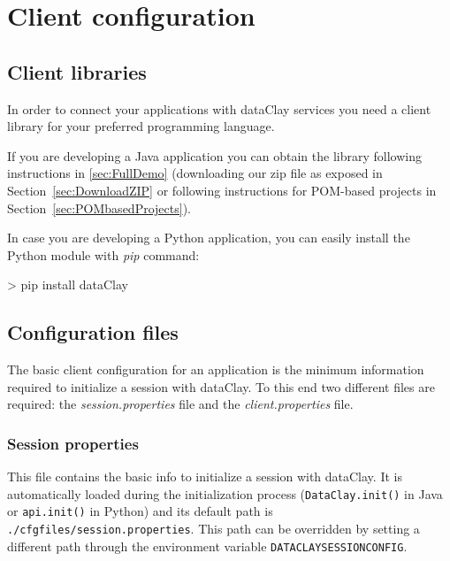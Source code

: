 
\chapter{Client configuration}

\section{Client libraries}
\label{sec:ClientLibraries}

In order to connect your applications with dataClay services you need a client library for your preferred programming language.

If you are developing a Java application you can obtain the library following instructions in \ref{sec:FullDemo} (downloading our zip file as exposed in Section~\ref{sec:DownloadZIP} or following instructions for POM-based projects in Section~\ref{sec:POMbasedProjects}).

In case you are developing a Python application, you can easily install the Python module with \textit{pip} command:

\begin{tBox}
\begin{bash}
> pip install dataClay
\end{bash}
\end{tBox}

\section{Configuration files}
\label{sec:ClientConfigFiles}

The basic client configuration for an application is the minimum information required to initialize a session with dataClay. To this end two different files are required: the \textit{session.properties} file and the \textit{client.properties} file.

\subsection{Session properties}
This file contains the basic info to initialize a session with dataClay. It is automatically loaded during the initialization process (\texttt{DataClay.init()} in Java or \texttt{api.init()} in Python) and its default path is \texttt{./cfgfiles/session.properties}. This path can be overridden by setting a different path through the environment variable \texttt{DATACLAYSESSIONCONFIG}. 

